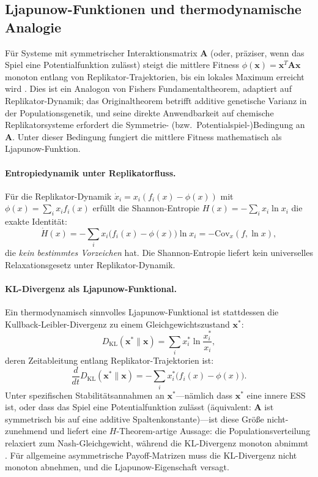 \documentclass[12pt,a4paper]{article}
\theoremstyle{remark}
\begin{document}
\subsection{Ljapunow-Funktionen und thermodynamische Analogie}

F\"ur Systeme mit symmetrischer Interaktionsmatrix $\mathbf{A}$ (oder, pr\"aziser, wenn das Spiel eine Potentialfunktion zul\"asst) steigt die mittlere Fitness $\phi(\mathbf{x}) = \mathbf{x}^T \mathbf{A} \mathbf{x}$ monoton entlang von Replikator-Trajektorien, bis ein lokales Maximum erreicht wird \citep{ReplicatorEntropy}. Dies ist ein Analogon von Fishers Fundamentaltheorem, adaptiert auf Replikator-Dynamik; das Originaltheorem betrifft additive genetische Varianz in der Populationsgenetik, und seine direkte Anwendbarkeit auf chemische Replikatorsysteme erfordert die Symmetrie- (bzw.\ Potentialspiel-)Bedingung an $\mathbf{A}$. Unter dieser Bedingung fungiert die mittlere Fitness mathematisch als Ljapunow-Funktion.

\paragraph{Entropiedynamik unter Replikatorfluss.}
F\"ur die Replikator-Dynamik $\dot{x}_i = x_i(f_i(x) - \phi(x))$ mit $\phi(x) = \sum_i x_i f_i(x)$ erf\"ullt die Shannon-Entropie $H(x) = -\sum_i x_i \ln x_i$ die exakte Identit\"at:
\begin{equation}
\dot{H}(x) = -\sum_i x_i \big(f_i(x) - \phi(x)\big) \ln x_i = -\mathrm{Cov}_x(f, \ln x),
\end{equation}
die \emph{kein bestimmtes Vorzeichen} hat. Die Shannon-Entropie liefert kein universelles Relaxationsgesetz unter Replikator-Dynamik.

\paragraph{KL-Divergenz als Ljapunow-Funktional.}
Ein thermodynamisch sinnvolles Ljapunow-Funktional ist stattdessen die Kullback-Leibler-Divergenz zu einem Gleichgewichtszustand $\mathbf{x}^*$:
\begin{equation}
D_{\mathrm{KL}}(\mathbf{x}^* \| \mathbf{x}) = \sum_i x_i^* \ln \frac{x_i^*}{x_i},
\end{equation}
deren Zeitableitung entlang Replikator-Trajektorien ist:
\begin{equation}
\frac{d}{dt} D_{\mathrm{KL}}(\mathbf{x}^* \| \mathbf{x}) = -\sum_i x_i^* \big(f_i(x) - \phi(x)\big).
\end{equation}
Unter spezifischen Stabilit\"atsannahmen an $\mathbf{x}^*$---n\"amlich dass $\mathbf{x}^*$ eine innere ESS ist, oder dass das Spiel eine Potentialfunktion zul\"asst (\"aquivalent: $\mathbf{A}$ ist symmetrisch bis auf eine additive Spaltenkonstante)---ist diese Gr\"o\ss{}e nicht-zunehmend und liefert eine $H$-Theorem-artige Aussage: die Populationsverteilung relaxiert zum Nash-Gleichgewicht, w\"ahrend die KL-Divergenz monoton abnimmt \citep{HofbauerSigmund1998,ReplicatorEntropy}. F\"ur allgemeine asymmetrische Payoff-Matrizen muss die KL-Divergenz nicht monoton abnehmen, und die Ljapunow-Eigenschaft versagt.
\end{document}
